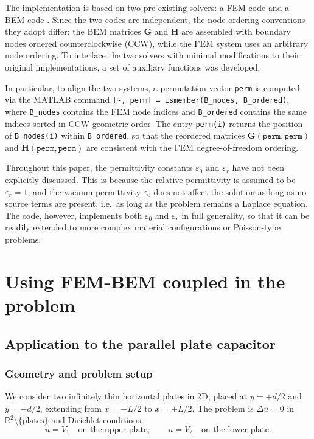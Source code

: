 \documentclass[11pt,onecolumn]{article}
\begin{document}
The implementation is based on two pre-existing solvers: a FEM code \cite{fem_code} and a BEM code \cite{bem_code}. Since the two codes are independent, the node ordering conventions they adopt differ: the BEM matrices $\mathbf{G}$ and $\mathbf{H}$ are assembled with boundary nodes ordered counterclockwise (CCW), while the FEM system uses an arbitrary node ordering. To interface the two solvers with minimal modifications to their original implementations, a set of auxiliary functions was developed.

\medskip\noindent
In particular, to align the two systems, a permutation vector \texttt{perm} is computed via the MATLAB command \texttt{[\textasciitilde, perm] = ismember(B\_nodes, B\_ordered)}, where \texttt{B\_nodes} contains the FEM node indices and \texttt{B\_ordered} contains the same indices sorted in CCW geometric order. The entry \texttt{perm(i)} returns the position of \texttt{B\_nodes(i)} within \texttt{B\_ordered}, so that the reordered matrices $\mathbf{G}(\texttt{perm},\texttt{perm})$ and $\mathbf{H}(\texttt{perm},\texttt{perm})$ are consistent with the FEM degree-of-freedom ordering.

\medskip\noindent
Throughout this paper, the permittivity constants $\varepsilon_0$ and $\varepsilon_r$ have not been explicitly discussed. This is because the relative permittivity is assumed to be $\varepsilon_r = 1$, and the vacuum permittivity $\varepsilon_0$ does not affect the solution as long as no source terms are present, i.e.\ as long as the problem remains a Laplace equation. The code, however, implements both $\varepsilon_0$ and $\varepsilon_r$ in full generality, so that it can be readily extended to more complex material configurations or Poisson-type problems.
\section{Using FEM-BEM coupled in the problem}
\subsection{Application to the parallel plate capacitor}

\subsubsection{Geometry and problem setup}

We consider two infinitely thin horizontal plates in 2D, placed at $y = +d/2$ and $y = -d/2$, 
extending from $x = -L/2$ to $x = +L/2$. The problem is $\Delta u = 0$ in $\mathbb{R}^2 
\setminus \{\text{plates}\}$ and Dirichlet conditions:
\begin{equation}
u = V_1 \quad \text{on the upper plate}, \qquad u = V_2 \quad \text{on the lower plate}.
\end{equation}
\end{document}
